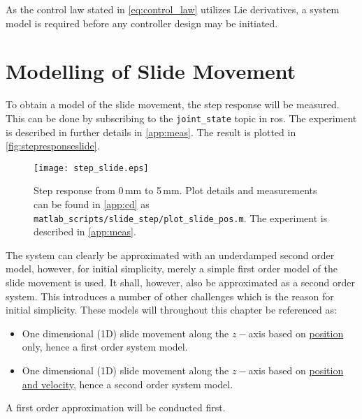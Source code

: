 As the control law stated in \autoref{eq:control_law} utilizes Lie derivatives, a system model is required before any controller design may be initiated.
\section{Modelling of Slide Movement}\label{sec:model_slide}
To obtain a model of the slide movement, the step response will be measured.  This can be done by subscribing to the \texttt{joint\_state} topic in \gls{ros}. The experiment is described in further details in \autoref{app:meas}. The result is plotted in \autoref{fig:stepresponseslide}. 
\begin{figure}[H]
\center
\texttt{[image: step\_slide.eps]}
\caption{Step response from 0\,mm to 5\,mm. Plot details and measurements can be found in \autoref{app:cd} as \texttt{matlab\_scripts/slide\_step/plot\_slide\_pos.m}. The experiment is described in \autoref{app:meas}.}
\label{fig:stepresponseslide}
\end{figure}
The system can clearly be approximated with an underdamped second order model, however, for initial simplicity, merely a simple first order model of the slide movement is used. It shall, however, also be approximated as a second order system. This introduces a number of other challenges which is the reason for initial simplicity. These models will throughout this chapter be referenced as:
\begin{itemize}
\item One dimensional (1D) slide movement along the $z-$axis based on \underline{position} only, hence a first order system model.
\item One dimensional (1D) slide movement along the $z-$axis based on \underline{position and velocity}, hence a second order system model.
\end{itemize}
A first order approximation will be conducted first. 
